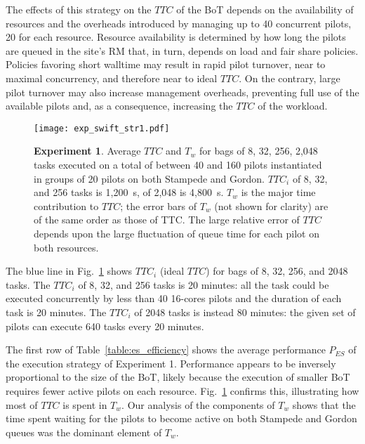 \documentclass[10pt, conference, compsocconf]{IEEEtran}
\newcommand{\B}[1]{\textbf{#1}\xspace}
\begin{document}
The effects of this strategy on the \(TTC\) of the BoT depends on the
availability of resources and the overheads introduced by managing up to 40
concurrent pilots, 20 for each resource.  Resource availability is determined
by how long the pilots are queued in the site's RM that, in turn, depends on
load and fair share policies. Policies favoring short walltime may result in
rapid pilot turnover, near to maximal concurrency, and therefore near to
ideal \(TTC\). On the contrary, large pilot turnover may also increase
management overheads, preventing full use of the available pilots and, as a
consequence, increasing the \(TTC\) of the workload.

\begin{figure}
  \centering
  \texttt{[image: exp\_swift\_str1.pdf]}
  \caption{ \B{Experiment 1}. Average \(TTC\) and \(T_w\) for bags of 8, 32,
            256, 2,048 tasks executed on a total of between 40 and 160 pilots
            instantiated in groups of 20 pilots on both Stampede and Gordon.
            \(TTC_i\) of 8, 32, and 256 tasks is 1,200~s, of 2,048 is
            4,800~s.
            \(T_w\) is the major time contribution to \(TTC\); the error bars
            of \(T_w\) (not shown for clarity) are of the same order as those
            of TTC\@. The large relative error of \(TTC\) depends upon the
            large fluctuation of queue time for each pilot on both
            resources.}\label{fig:exp_swift_1}
\end{figure}

The blue line in Fig.~\ref{fig:exp_swift_1} shows \(TTC_i\) (ideal \(TTC\))
for bags of 8, 32, 256, and 2048 tasks. The \(TTC_i\) of 8, 32, and 256 tasks
is 20 minutes: all the task could be executed concurrently by less than 40
16-cores pilots and the duration of each task is 20 minutes. The \(TTC_i\) of
2048 tasks is instead 80 minutes: the given set of pilots can execute 640
tasks every 20 minutes.

The first row of Table~\ref{table:es_efficiency} shows the average
performance \(P_{ES}\) of the execution strategy of Experiment 1. Performance
appears to be inversely proportional to the size of the BoT, likely because
the execution of smaller BoT requires fewer active pilots on each resource.
Fig.~\ref{fig:exp_swift_1} confirms this, illustrating how most of \(TTC\) is
spent in \(T_w\). Our analysis of the components of \(T_w\) shows that the
time spent waiting for the pilots to become active on both Stampede and
Gordon queues was the dominant element of \(T_w\).
\end{document}

